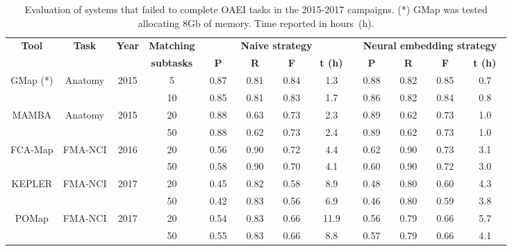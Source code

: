 \begin{table}[t!]
\caption{Evaluation of systems that failed to complete OAEI
tasks in the 2015-2017 campaigns. (*) GMap was tested allocating 8Gb of
memory. Time reported in hours~(h).}\label{table:tools}
\centering
\begin{tabular}{|c|c|c|c||c|c|c|c||c|c|c|c|}
\hline

\multirow{2}{*}{\textbf{Tool}} & \multirow{2}{*}{\textbf{Task}} & 
\multirow{2}{*}{\textbf{Year}}
& 
\textbf{Matching} 
& \multicolumn{4}{c||}{\textbf{Naive
strategy}} & \multicolumn{4}{c|}{\textbf{Neural embedding
strategy}}\\\cline{5-12}

& & & \textbf{subtasks} &
~\textbf{P}~ &
~\textbf{R}~ &  ~\textbf{F}~ &  ~\textbf{t (h)~} &
~\textbf{P}~ &
~\textbf{R}~ &  ~\textbf{F}~ &  ~\textbf{t (h)~}
\\\hline\hline

\multirow{2}{*}{GMap (*)} & \multirow{2}{*}{Anatomy} & \multirow{2}{*}{2015} 
& 5 & 0.87 & 0.81 & 0.84 & 1.3 & 0.88 & 0.82 & 0.85 & 0.7\\
& & & 10 & 0.85 & 0.81 & 0.83 &	1.7 & 0.86 & 0.82 & 0.84 & 0.8
\\\hline\hline

\multirow{2}{*}{MAMBA} & \multirow{2}{*}{Anatomy} & \multirow{2}{*}{2015} & 
20 & ~0.88~ & ~0.63~ & ~0.73~ & 2.3 & ~0.89~ & ~0.62~ & ~0.73~ & 1.0  \\
& & & 50 & 0.88 & 0.62 & 0.73 & 2.4 & 0.89 & 0.62 & 0.73 & 1.0
\\\hline\hline


\multirow{2}{*}{FCA-Map} & \multirow{2}{*}{FMA-NCI} & \multirow{2}{*}{2016} 
& 20 & 0.56 & 0.90 & 0.72 & 4.4 &  0.62 & 0.90 & 0.73 & 3.1 \\
& & & 50 & 0.58 & 0.90 & 0.70 &	4.1 & 0.60 & 0.90 & 0.72 & 3.0 \\\hline\hline


\multirow{2}{*}{KEPLER} & \multirow{2}{*}{FMA-NCI} & \multirow{2}{*}{2017} 
& 20 & 0.45 & 0.82 & 0.58 & 8.9 & 0.48 & 0.80 &	0.60 & 4.3\\
& & & 50 & 0.42 & 0.83 & 0.56 & 6.9 & 0.46 & 0.80 & 0.59 & 3.8
\\\hline\hline

\multirow{2}{*}{POMap} & \multirow{2}{*}{FMA-NCI} & \multirow{2}{*}{2017} 
& 20 & 0.54 & 0.83 & 0.66 &	11.9 & 0.56 & 0.79 & 0.66 & 5.7\\ 
& & & 50 & 0.55 & 0.83 & 0.66 & 8.8 & 0.57 & 0.79 & 0.66 & 4.1 \\\hline




 
\end{tabular}

\end{table}